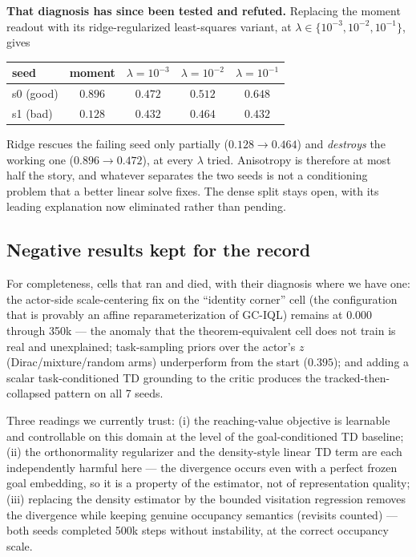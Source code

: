 \documentclass[10pt]{article}
\begin{document}
\textbf{That diagnosis has since been tested and refuted.} Replacing the moment
readout with its ridge-regularized least-squares variant, at
$\lambda\in\{10^{-3},10^{-2},10^{-1}\}$, gives

\begin{center}\small
\begin{tabular}{l c c c c}
\toprule
seed & moment & $\lambda{=}10^{-3}$ & $\lambda{=}10^{-2}$ & $\lambda{=}10^{-1}$ \\
\midrule
s0 (good) & $\mathbf{0.896}$ & $0.472$ & $0.512$ & $0.648$ \\
s1 (bad)  & $0.128$ & $0.432$ & $\mathbf{0.464}$ & $0.432$ \\
\bottomrule
\end{tabular}
\end{center}

Ridge rescues the failing seed only partially ($0.128\to0.464$) and \emph{destroys}
the working one ($0.896\to0.472$), at every $\lambda$ tried. Anisotropy is therefore
at most half the story, and whatever separates the two seeds is not a conditioning
problem that a better linear solve fixes. The dense split stays open, with its
leading explanation now eliminated rather than pending.

\subsection{Negative results kept for the record}
\label{sec:exp-neg}

For completeness, cells that ran and died, with their diagnosis where we have one:
the actor-side scale-centering fix on the ``identity corner'' cell (the configuration
that is provably an affine reparameterization of GC-IQL) remains at $0.000$ through
350k --- the anomaly that the theorem-equivalent cell does not train is real and
unexplained; task-sampling priors over the actor's $z$ (Dirac/mixture/random arms)
underperform from the start ($0.395$); and adding a scalar task-conditioned TD
grounding to the critic produces the tracked-then-collapsed pattern on all 7 seeds.

\medskip
Three readings we currently trust:
(i) the reaching-value objective is learnable and controllable on this domain at the level of the goal-conditioned TD baseline;
(ii) the orthonormality regularizer and the density-style linear TD term are each independently harmful here --- the divergence occurs even with a perfect frozen goal embedding, so it is a property of the estimator, not of representation quality;
(iii) replacing the density estimator by the bounded visitation regression removes the divergence while keeping genuine occupancy semantics (revisits counted) --- both seeds completed 500k steps without instability, at the correct occupancy scale.
\end{document}
